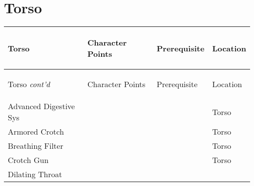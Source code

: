 \documentclass[twoside]{book}
\begin{document}
    

\section{Torso}
    
\begin{longtable}{p{1.25in}p{2em}ll} 
  Torso
  &
  \begin{turn}{70}{Character Points}\end{turn}
          
  &
  \begin{turn}{70}{Prerequisite}\end{turn}
          
  &
  \begin{turn}{70}{Location}\end{turn}
          
  \\
  \hline
  \hline
  \endfirsthead
  Torso \textit{cont'd}
        
  &
  \begin{turn}{70}{Character Points}\end{turn}
          
  &
  \begin{turn}{70}{Prerequisite}\end{turn}
          
  &
  \begin{turn}{70}{Location}\end{turn}
          
  \\
  \endhead
      
  \raggedright
           Advanced Digestive Sys 
  &
  
  &
  
  &
   Torso 
  \tabularnewline
  \hline
      
  \raggedright
           Armored Crotch 
  &
  
  &
  
  &
   Torso 
  \tabularnewline
  \hline
      
  \raggedright
           Breathing Filter 
  &
  
  &
  
  &
   Torso 
  \tabularnewline
  \hline
      
  \raggedright
           Crotch Gun 
  &
  
  &
  
  &
   Torso 
  \tabularnewline
  \hline
      
  \raggedright
           Dilating Throat 
  &
  

\end{longtable}
\end{document}
